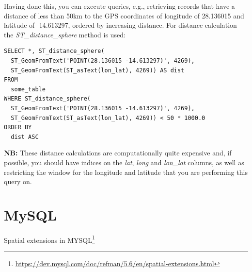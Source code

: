 \documentclass[a4paper]{book}
\begin{document}
\noindent Having done this, you can execute queries, e.g., retrieving records that have
a distance of less than 50km to the GPS coordinates of longitude of 28.136015
and latitude of -14.613297, ordered by increasing distance. For distance
calculation the \textit{ST\_distance\_sphere} method is used:
\begin{verbatim}
SELECT *, ST_distance_sphere(
  ST_GeomFromText('POINT(28.136015 -14.613297)', 4269),
  ST_GeomFromText(ST_asText(lon_lat), 4269)) AS dist
FROM
  some_table
WHERE ST_distance_sphere(
  ST_GeomFromText('POINT(28.136015 -14.613297)', 4269),
  ST_GeomFromText(ST_asText(lon_lat), 4269)) < 50 * 1000.0
ORDER BY
  dist ASC
\end{verbatim}

\noindent \textbf{NB:} These distance calculations are computationally quite expensive
and, if possible, you should have indices on the \textit{lat}, \textit{long}
and \textit{lon\_lat} columns, as well as restricting the window for the longitude
and latitude that you are performing this query on.

\section{MySQL}
Spatial extensions in MYSQL\footnote{\url{https://dev.mysql.com/doc/refman/5.6/en/spatial-extensions.html}{}}



\end{document}
